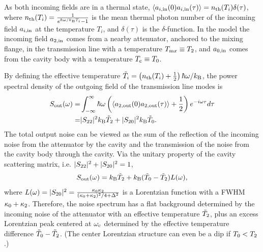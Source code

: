 As both incoming fields are in a thermal state, $\langle a_{i,\rm in}(0) a_{i,\rm in}(\tau) \rangle = n_{\rm th}(T_i) \delta(\tau)$, where $n_{\rm th}(T_i) = \frac{1}{e^{\hbar\omega/k_{\rm B}T_i} - 1}$ is the mean thermal photon number 
of the incoming field $a_{i,\rm in}$ at the temperature $T_i$, and 
$\delta(\tau)$ is the $\delta$-function. In the model the incoming field 
$a_{\rm 2,in}$ comes from a nearby attenuator, anchored to the mixing flange, 
in the transmission line 
with a temperature $T_{\text mx} \equiv T_{\rm 2}$, and $a_{\rm 0,in}$ comes 
from the cavity body with a temperature $T_{\text c} \equiv T_{\rm 0}$.

By defining the effective temperature $\Tilde{T}_i = \left( n_{\rm th}(T_i) + \frac{1}{2} \right) \hbar\omega/k_{\rm B}$,
the power spectral density of the outgoing field of the transmission line 
modes is
\begin{equation}
\label{eq:spectrum_relation}
\begin{aligned}
    S_{\rm out}(\omega) 
    =& \int_{-\infty}^{\infty} \hbar\omega \left(\langle a_{2,\rm out}(0) a_{2,\rm out}(\tau) \rangle + \frac{1}{2} \right) e^{-i\omega\tau} d\tau \\
    =& |S_{\rm 22}|^2 k_{\rm B} \Tilde{T}_2 + |S_{\rm 20}|^2 k_{\rm B} \Tilde{T}_0.
\end{aligned}
\end{equation}
The total output noise can be viewed as the sum of the reflection of the 
incoming noise from the attenuator by the cavity and the transmission of the 
noise from the cavity body through the cavity. Via the unitary property of 
the cavity scattering matrix, i.e. $|S_{\rm 22}|^2+|S_{\rm 20}|^2=1$,
\begin{equation}
\label{eq:spectrum_relation_Lorentz}
\begin{aligned}
    S_{\rm out}(\omega) =  k_{\rm B} \Tilde{T}_2 + k_{\rm B} (\Tilde{T}_0 - \Tilde{T}_2) L(\omega),
\end{aligned}
\end{equation}
where $L(\omega) = |S_{\rm 20}|^2 = \frac {\kappa_0 \kappa_{\rm 2}}  {(\kappa_0+\kappa_{\rm 2})^2/4 + \Delta^2}$ is a Lorentzian function with a FWHM 
$\kappa_0+\kappa_{\rm 2}$. Therefore, the noise spectrum has a flat background
 determined by the incoming noise of the attenuator with an effective 
temperature $\Tilde{T}_{\rm 2}$, plus an excess Lorentzian peak centered at 
$\omega_{\rm c}$ determined by the effective temperature difference 
$\Tilde{T}_{\rm 0} - \Tilde{T}_{\rm 2}$. (The center Lorentzian structure 
can even be a dip if ${T}_{\rm 0} < {T}_{\rm 2}$.)

